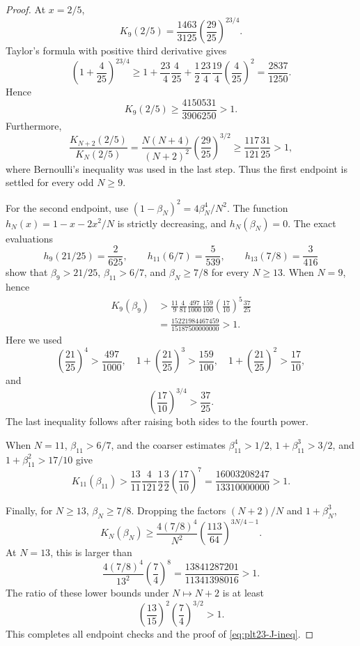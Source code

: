 \documentclass[11pt]{article}
\numberwithin{equation}{section}
\begin{document}
\begin{proof}
  At $x=2/5$,
  \[
    K_9(2/5)=\frac{1463}{3125}
    \left(\frac{29}{25}\right)^{23/4}.
  \]
  Taylor's formula with positive third derivative gives
  \[
    \left(1+\frac{4}{25}\right)^{23/4}
    \ge1+\frac{23}{4}\frac{4}{25}
    +\frac{1}{2}\frac{23}{4}\frac{19}{4}
    \left(\frac{4}{25}\right)^2
    =\frac{2837}{1250}.
  \]
  Hence
  \[
    K_9(2/5)\ge\frac{4150531}{3906250}>1.
  \]
  Furthermore,
  \[
    \frac{K_{N+2}(2/5)}{K_N(2/5)}
    =\frac{N(N+4)}{(N+2)^2}
    \left(\frac{29}{25}\right)^{3/2}
    \ge\frac{117}{121}\frac{31}{25}>1,
  \]
  where Bernoulli's inequality was used in the last step.
  Thus the first endpoint is settled for every odd $N\ge9$.

  For the second endpoint, use $(1-\beta_N)^2=4\beta_N^4/N^2$.
  The function $h_N(x)=1-x-2x^2/N$ is strictly decreasing, and $h_N(\beta_N)=0$.
  The exact evaluations
  \[
    h_9(21/25)=\frac{2}{625},\qquad
    h_{11}(6/7)=\frac{5}{539},\qquad
    h_{13}(7/8)=\frac{3}{416}
  \]
  show that $\beta_9>21/25$, $\beta_{11}>6/7$, and $\beta_N\ge7/8$ for every $N\ge13$.
  When $N=9$, hence
  \begin{align*}
    K_9(\beta_9)
    &>\frac{11}{9}\frac{4}{81}
    \frac{497}{1000}\frac{159}{100}
    \left(\frac{17}{10}\right)^5\frac{37}{25}\\
    &=\frac{15221984467459}{15187500000000}>1.
  \end{align*}
  Here we used
  \[
    \left(\frac{21}{25}\right)^4>\frac{497}{1000},
    \quad
    1+\left(\frac{21}{25}\right)^3>\frac{159}{100},
    \quad
    1+\left(\frac{21}{25}\right)^2>\frac{17}{10},
  \]
  and
  \[
    \left(\frac{17}{10}\right)^{3/4}>\frac{37}{25}.
  \]
  The last inequality follows after raising both sides to the fourth power.

  When $N=11$, $\beta_{11}>6/7$, and the coarser estimates $\beta_{11}^4>1/2$, $1+\beta_{11}^3>3/2$, and $1+\beta_{11}^2>17/10$ give
  \[
    K_{11}(\beta_{11})
    >\frac{13}{11}\frac{4}{121}\frac{1}{2}\frac{3}{2}
    \left(\frac{17}{10}\right)^7
    =\frac{16003208247}{13310000000}>1.
  \]

  Finally, for $N\ge13$, $\beta_N\ge7/8$.
  Dropping the factors $(N+2)/N$ and $1+\beta_N^3$,
  \[
    K_N(\beta_N)
    \ge\frac{4(7/8)^4}{N^2}
    \left(\frac{113}{64}\right)^{3N/4-1}.
  \]
  At $N=13$, this is larger than
  \[
    \frac{4(7/8)^4}{13^2}\left(\frac{7}{4}\right)^8
    =\frac{13841287201}{11341398016}>1.
  \]
  The ratio of these lower bounds under $N\mapsto N+2$ is at least
  \[
    \left(\frac{13}{15}\right)^2
    \left(\frac{7}{4}\right)^{3/2}>1.
  \]
  This completes all endpoint checks and the proof of \eqref{eq:plt23-J-ineq}.
\end{proof}
\end{document}
